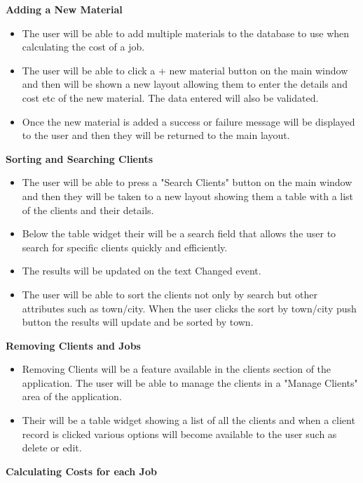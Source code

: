 \textbf{Adding a New Material}

	\begin{itemize}
		\item The user will be able to add multiple materials to the database to use when calculating the cost of a job.
		\item The user will be able to click a + new material button on the main window and then will be shown a new layout allowing them to enter the details and cost etc of the new material. The data entered will also be validated.
		\item Once the new material is added a success or failure message will be displayed to the user and then they will be returned to the main layout.
	\end{itemize}

\textbf{Sorting and Searching Clients}

	\begin{itemize}
		\item The user will be able to press a "Search Clients" button on the main window and then they will be taken to a new layout showing them a table with a list of the clients and their details. 
		\item Below the table widget their  will be a search field that allows the user to search for specific clients quickly and efficiently.
		\item The results will be updated on the text Changed event.
		\item The user will be able to sort the clients not only by search but other attributes such as town/city. When the user clicks the sort by town/city push button the results will update and be sorted by town.
	\end{itemize}

\textbf{Removing Clients and Jobs}

	\begin{itemize}
		\item Removing Clients will be a feature available in the clients section of the application. The user will be able to manage the clients in a "Manage Clients" area of the application.
		\item Their will be a table widget showing a list of all the clients and when a client record is clicked various options will become available to the user such as delete or edit. 
	\end{itemize}

\textbf{Calculating Costs for each Job}

